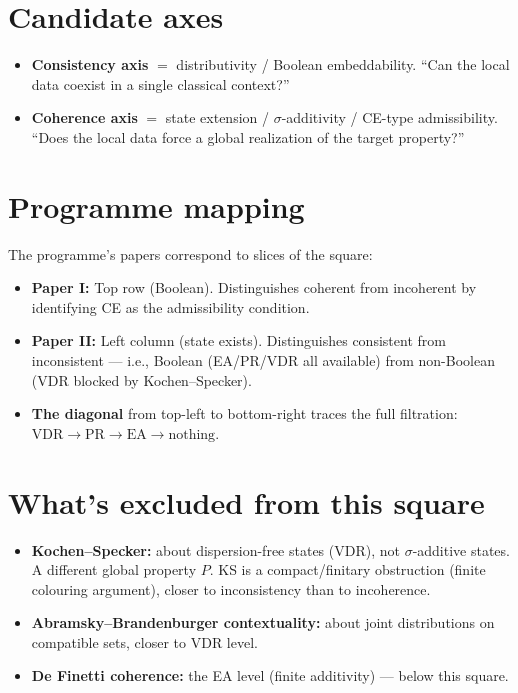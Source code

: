 \documentclass[11pt]{article}
\begin{document}
\section*{Candidate axes}

\begin{itemize}[nosep]
  \item \textbf{Consistency axis} $=$ distributivity / Boolean
    embeddability.  ``Can the local data coexist in a single
    classical context?''
  \item \textbf{Coherence axis} $=$ state extension /
    $\sigma$-additivity / CE-type admissibility.  ``Does the local
    data force a global realization of the target property?''
\end{itemize}

\section*{Programme mapping}

The programme's papers correspond to slices of the square:
\begin{itemize}[nosep]
  \item \textbf{Paper I:} Top row (Boolean).  Distinguishes coherent
    from incoherent by identifying CE as the admissibility condition.
  \item \textbf{Paper II:} Left column (state exists).  Distinguishes
    consistent from inconsistent --- i.e., Boolean (EA/PR/VDR all
    available) from non-Boolean (VDR blocked by Kochen--Specker).
  \item \textbf{The diagonal} from top-left to bottom-right traces the
    full filtration: $\mathrm{VDR} \to \mathrm{PR} \to \mathrm{EA}
    \to \text{nothing}$.
\end{itemize}

\section*{What's excluded from this square}

\begin{itemize}[nosep]
  \item \textbf{Kochen--Specker:} about dispersion-free states (VDR),
    not $\sigma$-additive states.  A different global property $P$.
    KS is a compact/finitary obstruction (finite colouring argument),
    closer to inconsistency than to incoherence.
  \item \textbf{Abramsky--Brandenburger contextuality:} about joint
    distributions on compatible sets, closer to VDR level.
  \item \textbf{De Finetti coherence:} the EA level (finite
    additivity) --- below this square.
\end{itemize}
\end{document}
